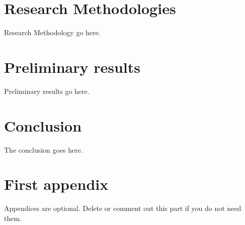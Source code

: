 \documentclass[journal]{IEEEtran}
\begin{document}
		
		
	
\section{Research Methodologies}	
	Research Methodology go here.


	
\section{Preliminary results}
	Preliminary results go here.


\section{Conclusion}
	The conclusion goes here.






\appendices
\section{First appendix}
Appendices are optional. Delete or comment out this part if you do not need them.

\end{document}
